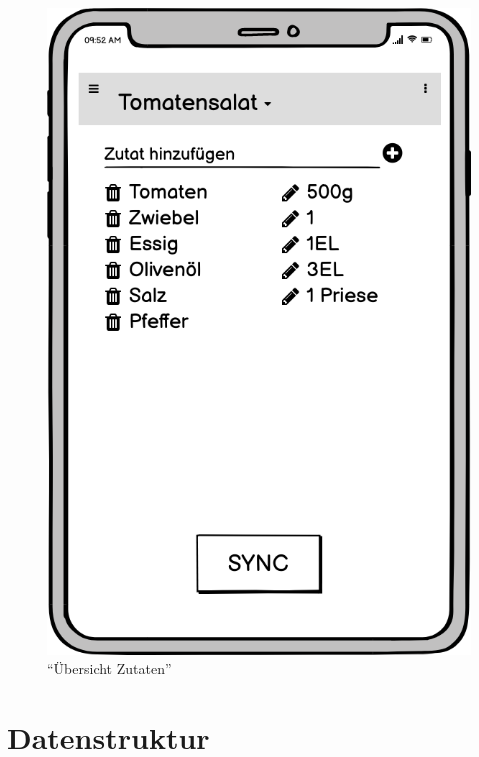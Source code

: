 \documentclass[a4paper, 12pt]{scrreprt}
\begin{document}
\begin{figure}[h!]
\begin{minipage}{.45\textwidth}
		\includegraphics[width=1\textwidth]{wireframeZutaten2.png}
		\caption{\enquote{Übersicht Zutaten}}
		\label{fig:zutatenFrame}
	\end{minipage}
\end{figure}



\section{Datenstruktur}
\end{document}
